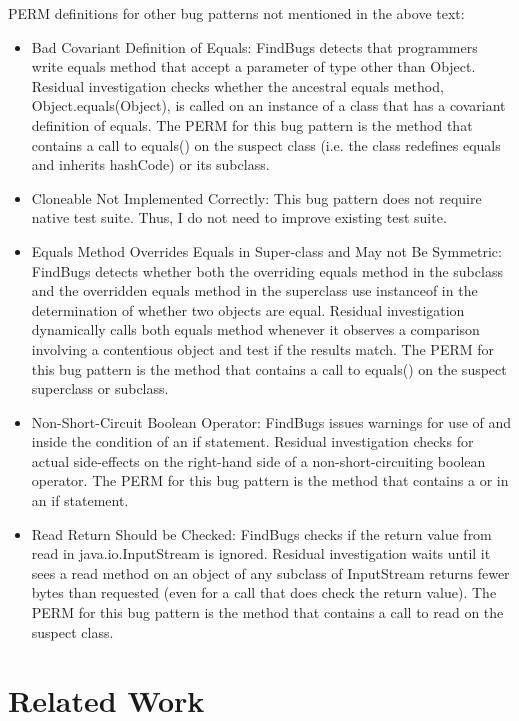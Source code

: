 \documentclass[proposal]{umthesis} %
\begin{document}
PERM definitions for other bug patterns not mentioned in the above text:
\begin{itemize}
\item Bad Covariant Definition of Equals: FindBugs detects that programmers write equals method that accept a parameter of type other than Object.  Residual investigation checks whether the ancestral equals method, Object.equals(Object), is called on an instance of a class that has a covariant definition of equals.  The PERM for this bug pattern is the method that contains a call to equals() on the suspect class (i.e. the class redefines equals and inherits hashCode) or its subclass.
\item Cloneable Not Implemented Correctly: This bug pattern does not require native test suite.  Thus, I do not need to improve existing test suite.
\item Equals Method Overrides Equals in Super-class and May not Be Symmetric: FindBugs detects whether both the overriding equals method in the subclass and the overridden equals method in the superclass use instanceof in the determination of whether two objects are equal.  Residual investigation dynamically calls both equals method whenever it observes a comparison involving a contentious object and test if the results match.  The PERM for this bug pattern is the method that contains a call to equals() on the suspect superclass or subclass.
\item Non-Short-Circuit Boolean Operator: FindBugs issues warnings for use of \sv{\&} and \sv{|} inside the condition of an if statement.  Residual investigation checks for actual side-effects on the right-hand side of a non-short-circuiting boolean operator.  The PERM for this bug pattern is the method that contains a \sv{\&} or \sv{|} in an if statement.
\item Read Return Should be Checked: FindBugs checks if the return value from read in java.io.InputStream is ignored.  Residual investigation waits until it sees a read method on an object of any subclass of InputStream returns fewer bytes than requested (even for a call that does check the return value).  The PERM for this bug pattern is the method that contains a call to read on the suspect class.
\end{itemize}

\chapter{Related Work}
\label{chp:related}
\end{document}
